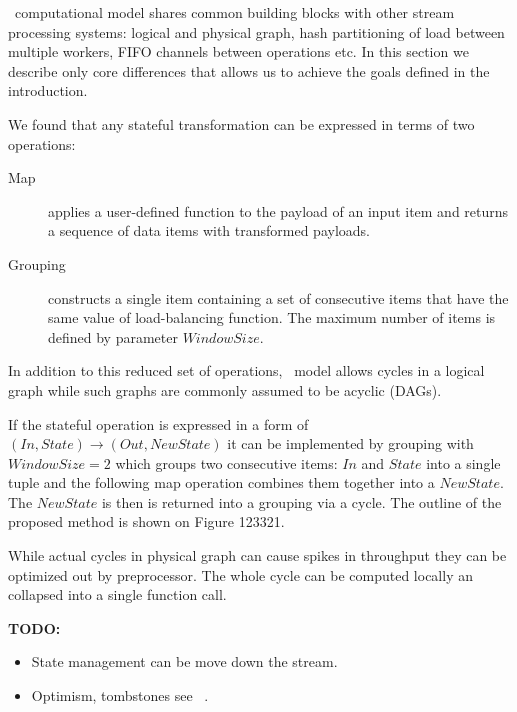 \label {fs-short-model}

\FlameStream\ computational model shares common building blocks with other stream processing systems: logical and physical graph, hash partitioning of load between multiple workers, FIFO channels between operations etc. In this section we describe only core differences that allows us to achieve the goals defined in the introduction.

We found that any stateful transformation can be expressed in terms of two operations:

\begin {description}
  \item [Map] applies a user-defined function to the payload of an input item and returns a sequence of data items with transformed payloads. 
  \item [Grouping] constructs a single item containing a set of consecutive items that have the same value of load-balancing function. The maximum number of items is defined by parameter $Window Size$. 
\end {description}

In addition to this reduced set of operations, \FlameStream\ model allows cycles in a logical graph while such graphs are commonly assumed to be acyclic (DAGs).

If the stateful operation is expressed in a form of $(In, State) \rightarrow (Out, NewState)$ it can be implemented by grouping with $WindowSize = 2$ which groups two consecutive items: $In$ and $State$ into a single tuple and the following map operation combines them together into a $NewState$. The $NewState$ is then is returned into a grouping via a cycle. The outline of the proposed method is shown on Figure 123321.

While actual cycles in physical graph can cause spikes in throughput they can be optimized out by preprocessor. The whole cycle can be computed locally an collapsed into a single function call.

{\bf TODO:}

\begin{itemize}
  \item State management can be move down the stream.
  \item Optimism, tombstones see ~\cite{we2018seim}.
\end{itemize}
